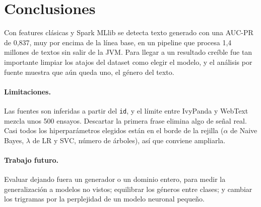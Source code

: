 \documentclass[runningheads]{llncs}
\begin{document}
\section{Conclusiones}

Con features clásicas y Spark MLlib se detecta texto generado con una AUC-PR de 0,837, muy por
encima de la línea base, en un pipeline que procesa 1,4 millones de textos sin salir de la JVM.
Para llegar a un resultado creíble fue tan importante limpiar los atajos del dataset como
elegir el modelo, y el análisis por fuente muestra que aún queda uno, el género del texto.

\paragraph{Limitaciones.} Las fuentes son inferidas a partir del \texttt{id}, y el límite entre
IvyPanda y WebText mezcla unos 500 ensayos. Descartar la primera frase elimina algo de señal
real. Casi todos los hiperparámetros elegidos están en el borde de la rejilla ($\alpha$ de
Naive Bayes, $\lambda$ de LR y SVC, número de árboles), así que conviene ampliarla.

\paragraph{Trabajo futuro.} Evaluar dejando fuera un generador o un dominio entero, para medir
la generalización a modelos no vistos; equilibrar los géneros entre clases; y cambiar los
trigramas por la perplejidad de un modelo neuronal pequeño.



\end{document}

